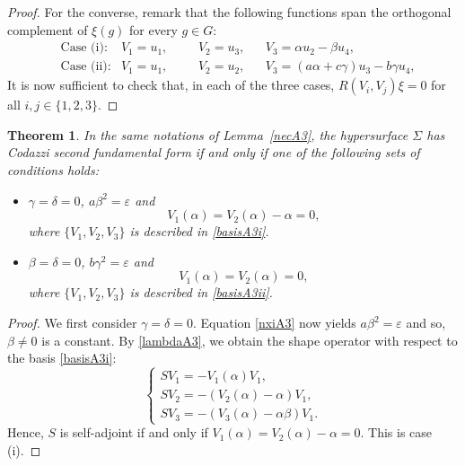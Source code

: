 \documentclass{amsart}
\theoremstyle{plain}
\newtheorem{theorem}{Theorem}
\theoremstyle{remark}
\newcommand\m{{\mathfrak{m}}}
\begin{document}
{\begin{proof}
For the converse, remark that the following functions span the orthogonal complement of $\xi(g)$ for every $g\in G$:
\begin{align}
& \mbox{Case (i)}: & V_1=u_1, &&& V_2=u_3, && V_3=\alpha u_2 - \beta u_4, \label{basisA3i} \\
& \mbox{Case (ii)}: & V_1=u_1, &&& V_2=u_2, && V_3=(a\alpha+c\gamma)u_3 -b\gamma u_4, \label{basisA3ii} 
\end{align}
It is now sufficient to check that, in each of the three cases, $R(V_i,V_j)\xi =0$ for all $i,j \in \{1,2,3\}$.
\end{proof}
%

\begin{theorem}\label{codA3}
In the same notations of Lemma~{\em \ref{necA3}}, the hypersurface $\Sigma$ has Codazzi second fundamental form if and only if one of the following sets of conditions holds: 
\begin{itemize}
\item[(i)] $\gamma=\delta=0$, $a\beta^2 = \varepsilon$ and  \[
V_1(\alpha)=V_2(\alpha)-\alpha=0, 
\]
where $\{V_1,V_2,V_3\}$ is described in \eqref{basisA3i}.
\vspace{1mm}
\item[(ii)] $\beta = \delta = 0$, $b\gamma^2 = \varepsilon$ and 
\[
V_1(\alpha)=V_2(\alpha)=0,
\]
where $\{V_1,V_2,V_3\}$ is described in \eqref{basisA3ii}.
\end{itemize}
\end{theorem}

\begin{proof}
We first consider $\gamma=\delta =0$. Equation \eqref{nxiA3} now yields $a\beta ^2 =\varepsilon$ and so, $\beta \neq 0$ is a constant. By \eqref{lambdaA3}, we obtain the shape operator with respect to the basis \eqref{basisA3i}:
%
\begin{equation}\label{sA3i}
\left\{
\begin{array}{l}
SV_1 =  -V_1(\alpha) V_1, \\[2 pt]
SV_2 =  -(V_2(\alpha)-\alpha) V_1, \\[2 pt]
SV_3 =  -(V_3(\alpha)-\alpha\beta)V_1.
\end{array}
\right.
\end{equation}
%
Hence, $S$ is self-adjoint if and only if $V_1(\alpha)=V_2(\alpha)-\alpha=0$. This is case (i).


\end{proof}}
\end{document}
